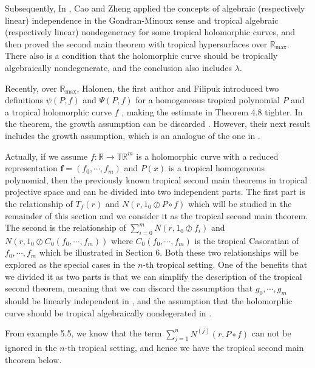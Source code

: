 \documentclass{article}
\begin{document}
Subsequently, In \cite{Thyp}, Cao and Zheng applied the concepts of algebraic (respectively linear) independence in the Gondran-Minoux sense and tropical algebraic (respectively linear) nondegeneracy for some tropical holomorphic curves, and then proved the second main theorem with tropical hypersurfaces over $\mathbb{R}_{\max}$. There also is a condition that the holomorphic curve should be tropically algebraically nondegenerate, and the conclusion also includes $\lambda$.

Recently, over $\mathbb{R}_{\max}$, Halonen, the first author and Filipuk introduced two definitions 
$\psi(P, f)$ and $\Psi(P, f)$ for a homogeneous tropical polynomial $P$ and a tropical holomorphic curve $f$ \cite{Tnp}, making the estimate in Theorem 4.8 \cite{Thyp} tighter. In the theorem, the growth assumption can be discarded \cite[Corollary 3.5]{Tnp}. However, their next result \cite[Corollary 3.6]{Tnp} includes the growth assumption, which is an analogue of the one in \cite[Theorem 4.8]{Thyp}. 

Actually, if we assume $f:\mathbb{R}\rightarrow \mathbb{T}\mathbb{R}^{m}$ is a holomorphic curve with a reduced representation $\textbf{f}=(f_{0}, \cdots, f_{m})$ and $P(x)$ is a tropical homogeneous polynomial, then the previously known tropical second main theorems in tropical projective space \cite[Theorem 6.2 and 6.3]{Pro} and \cite[Theorem 4.8]{Thyp} can be divided into two independent parts. The first part is the relationship of $T_{f}(r)$ and $N(r, 1_{0}\oslash P\circ f)$ which will be studied in the remainder of this section and we consider it as the tropical second main theorem. The second is the relationship of $\sum_{i=0}^{m}N(r, 1_{0}\oslash f_{i})$ and $N(r, 1_{0}\oslash C_{0}(f_{0}, \cdots, f_{m}))$ where $C_{0}(f_{0}, \cdots, f_{m})$ is the tropical Casoratian of $f_{0}, \cdots, f_{m}$ which be illustrated in Section 6. Both these two relationships will be explored as the special cases in the $n$-th tropical setting. One of the benefits that we divided it as two parts is that we can simplify the description of the tropical second theorem, meaning that we can discard the assumption that $g_{0}, \cdots, g_{m}$ should be linearly independent in \cite[Theorem~6.6]{Pro}, and the assumption that the holomorphic curve should be tropical algebraically nondegerated in \cite[Theorem~4.8]{Thyp}.

From example 5.5, we know that the term $\sum_{j=1}^{n}N^{(j)}(r, P\circ f)$ can not be ignored in the $n$-th tropical setting, and hence we have the tropical second main theorem below.
\end{document}

